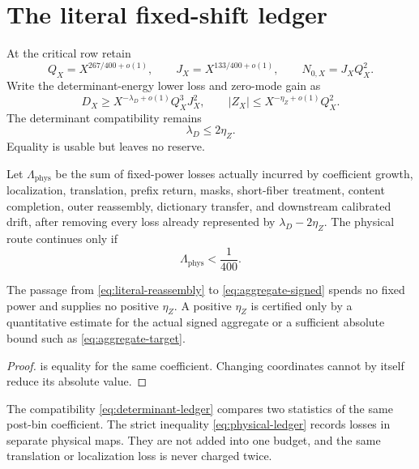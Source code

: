 \section{The literal fixed-shift ledger}
\label{sec:ledger}

At the critical row retain
\[
 Q_X=X^{267/400+o(1)},\qquad
 J_X=X^{133/400+o(1)},\qquad
 N_{0,X}=J_XQ_X^2.
\]
Write the determinant-energy lower loss and zero-mode gain as
\[
 D_X\ge X^{-\lambda_D+o(1)}Q_X^3J_X^2,
 \qquad
 |Z_X|\le X^{-\eta_Z+o(1)}Q_X^2.
\]
The determinant compatibility remains
\begin{equation}
 \lambda_D\le2\eta_Z.
\label{eq:determinant-ledger}
\end{equation}
Equality is usable but leaves no reserve.

\begin{definition}
\label{def:physical-ledger}
Let \(\Lambda_{\mathrm{phys}}\) be the sum of fixed-power losses
actually incurred by coefficient growth, localization, translation,
prefix return, masks, short-fiber treatment, content completion,
outer reassembly, dictionary transfer, and downstream calibrated
drift, after removing every loss already represented by
\(\lambda_D-2\eta_Z\).  The physical route continues only if
\begin{equation}
 \boxed{\qquad
 \Lambda_{\mathrm{phys}}<\frac1{400}.
 \qquad}
\label{eq:physical-ledger}
\end{equation}
\end{definition}

\begin{proposition}
\label{prop:no-saving-identity}
The passage from \eqref{eq:literal-reassembly} to
\eqref{eq:aggregate-signed} spends no fixed power and supplies no
positive \(\eta_Z\).  A positive \(\eta_Z\) is certified only by a
quantitative estimate for the actual signed aggregate or a sufficient
absolute bound such as \eqref{eq:aggregate-target}.
\end{proposition}

\begin{proof}
 is equality for the same coefficient.
Changing coordinates cannot by itself reduce its absolute value.
\end{proof}

\begin{remark}
\label{rem:independent-accounts}
The compatibility \eqref{eq:determinant-ledger} compares two
statistics of the same post-bin coefficient.  The strict inequality
\eqref{eq:physical-ledger} records losses in separate physical maps.
They are not added into one budget, and the same translation or
localization loss is never charged twice.
\end{remark}

